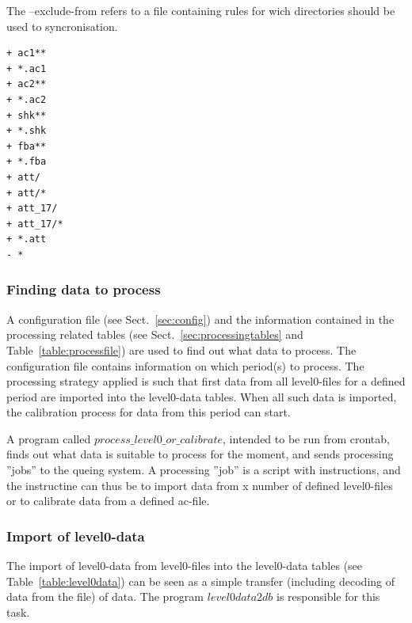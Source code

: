 \documentclass[12pt]{article}
\begin{document}
The --exclude-from refers to a file containing rules for wich directories should be used to syncronisation.

\begin{verbatim}
+ ac1**
+ *.ac1
+ ac2**
+ *.ac2
+ shk**
+ *.shk
+ fba**
+ *.fba
+ att/
+ att/*
+ att_17/
+ att_17/*
+ *.att
- *
\end{verbatim}



\subsubsection{Finding data to process}
\label{sec:findingdata}
A configuration file (see Sect.~\ref{sec:config})
and the information contained 
in the processing related tables (see Sect.~\ref{sec:processingtables}
and Table~\ref{table:processfile}) 
are used to find out what data to process. 
The configuration file contains information on which period(s)
to process. The processing strategy applied is such that
first data from all level0-files for a defined period
are imported into the level0-data tables.
When all such data is imported, the calibration process
for data from this period can start.

A program called \(process\_level0\_or\_calibrate\), intended to be run
from crontab, finds out what data is suitable to process for the moment,
and sends processing ''jobs'' to the queing system.
A processing ''job'' is a script with instructions, 
and the instructine can thus be to import data from
x number of defined level0-files or to calibrate data from a defined 
ac-file.




\subsubsection{Import of level0-data}
\label{sec:level0import}
The import of level0-data from level0-files
into the level0-data tables (see Table~\ref{table:level0data})
can be seen as a simple transfer (including decoding of data from the file) 
of data. The program \(level0data2db\) is responsible for this task.  
 
\end{document}
